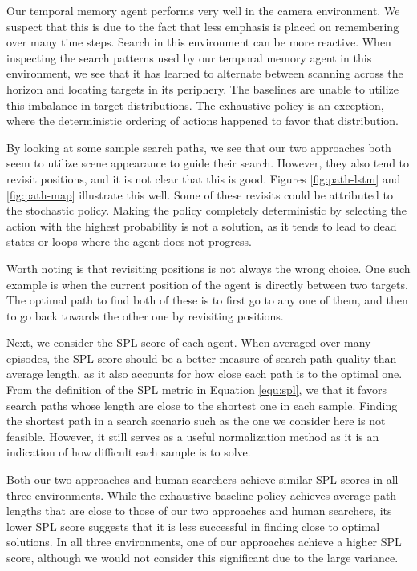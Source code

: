 Our temporal memory agent performs very well in the camera environment.
We suspect that this is due to the fact that less emphasis is placed on remembering over many time steps.
Search in this environment can be more reactive.
When inspecting the search patterns used by our temporal memory agent in this environment, we see that it has learned to alternate between scanning across the horizon and locating targets in its periphery.
The baselines are unable to utilize this imbalance in target distributions.
The exhaustive policy is an exception, where the deterministic ordering of actions happened to favor that distribution. 

By looking at some sample search paths, we see that our two approaches both seem to utilize scene appearance to guide their search.
However, they also tend to revisit positions, and it is not clear that this is good.
Figures \ref{fig:path-lstm} and \ref{fig:path-map} illustrate this well.
Some of these revisits could be attributed to the stochastic policy.
Making the policy completely deterministic by selecting the action with the highest probability is not a solution, as it tends to lead to dead states or loops where the agent does not progress.

Worth noting is that revisiting positions is not always the wrong choice.
One such example is when the current position of the agent is directly between two targets.
The optimal path to find both of these is to first go to any one of them, and then to go back towards the other one by revisiting positions.

Next, we consider the SPL score of each agent.
When averaged over many episodes, the SPL score should be a better measure of search path quality than average length, as it also accounts for how close each path is to the optimal one.
From the definition of the SPL metric in Equation \ref{equ:spl}, we that it favors search paths whose length are close to the shortest one in each sample.
Finding the shortest path in a search scenario such as the one we consider here is not feasible.
However, it still serves as a useful normalization method as it is an indication of how difficult each sample is to solve.

Both our two approaches and human searchers achieve similar SPL scores in all three environments.
While the exhaustive baseline policy achieves average path lengths that are close to those of our two approaches and human searchers, its lower SPL score suggests that it is less successful in finding close to optimal solutions.
In all three environments, one of our approaches achieve a higher SPL score,
although we would not consider this significant due to the large variance.

